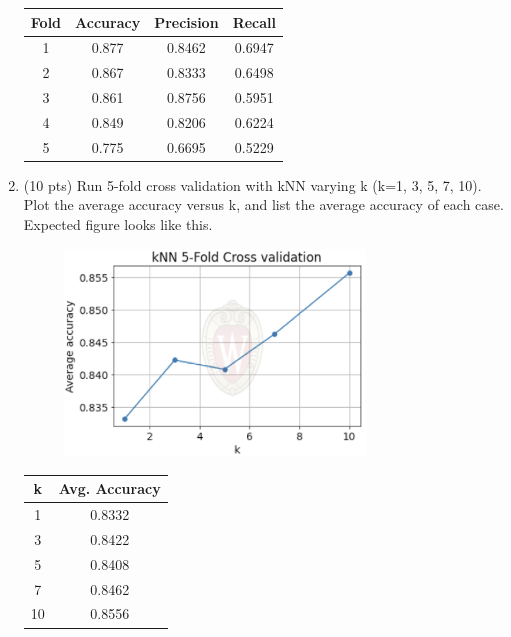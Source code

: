 \documentclass[a4paper]{article}
\theoremstyle{definition}
\newenvironment{soln}{
    \leavevmode\color{blue}\ignorespaces
}{}
\begin{document}
\begin{enumerate}
	\begin{soln}
		\begin{center}
			\begin{tabular}{|c|c|c|c|}
				\hline
				Fold & Accuracy & Precision & Recall \\
				\hline
				1  &  0.877  &  0.8462  &  0.6947  \\
				2  &  0.867  &  0.8333  &  0.6498  \\
				3  &  0.861  &  0.8756  &  0.5951  \\
				4  &  0.849  &  0.8206  &  0.6224  \\
				5  &  0.775  &  0.6695  &  0.5229  \\
				\hline
			\end{tabular}
		\end{center}
	\end{soln}
	
	\item (10 pts) Run 5-fold cross validation with kNN varying k (k=1, 3, 5, 7, 10). Plot the average accuracy versus k, and list the average accuracy of each case. \\
	Expected figure looks like this.
	\begin{figure}[h]
		\centering
		\includegraphics[width=8cm]{../figs/knn.png}
	\end{figure}
	
	\begin{soln}
		\begin{center}
			\begin{tabular}{|c|c|}
				\hline
				k & Avg. Accuracy \\
				\hline
				1 & 0.8332 \\
				3 & 0.8422 \\
				5 & 0.8408 \\
				7 & 0.8462 \\
				10 & 0.8556 \\
				\hline
			\end{tabular}
		\end{center}
		

\end{soln}
\end{enumerate}
\end{document}

